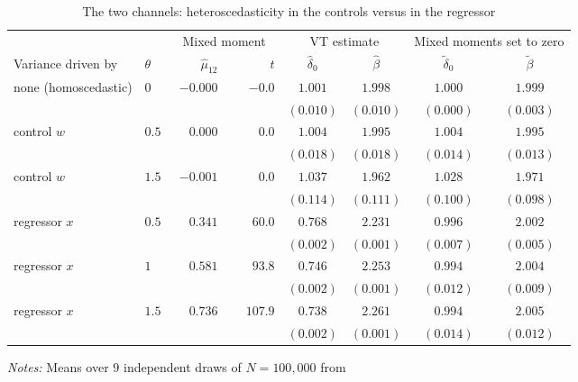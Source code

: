 \begin{table}[!h]
\centering
\caption{The two channels: heteroscedasticity in the controls versus in the regressor}
\label{tab:het_channels}
\begin{threeparttable}
\begin{tabular}{llrrcccc}
\toprule
& & \multicolumn{2}{c}{Mixed moment}
& \multicolumn{2}{c}{VT estimate}
& \multicolumn{2}{c}{Mixed moments set to zero} \\
\cmidrule(lr){3-4}\cmidrule(lr){5-6}\cmidrule(lr){7-8}
Variance driven by & \(\theta\)
& \(\widehat\mu_{12}\) & \(t\)
& \(\widehat\delta_0\) & \(\widehat\beta\)
& \(\widetilde\delta_0\) & \(\widetilde\beta\) \\
\midrule
none (homoscedastic) & \(0\) & \(-0.000\) & \(-0.0\)
  & \(1.001\) & \(1.998\) & \(1.000\) & \(1.999\) \\
  & & & & \((0.010)\) & \((0.010)\) & \((0.000)\) & \((0.003)\) \\
\midrule
control \(w\) & \(0.5\) & \(\phantom{-}0.000\) & \(\phantom{-}0.0\)
  & \(1.004\) & \(1.995\) & \(1.004\) & \(1.995\) \\
  & & & & \((0.018)\) & \((0.018)\) & \((0.014)\) & \((0.013)\) \\
control \(w\) & \(1.5\) & \(-0.001\) & \(\phantom{-}0.0\)
  & \(1.037\) & \(1.962\) & \(1.028\) & \(1.971\) \\
  & & & & \((0.114)\) & \((0.111)\) & \((0.100)\) & \((0.098)\) \\
\midrule
regressor \(x\) & \(0.5\) & \(\phantom{-}0.341\) & \(\phantom{-}60.0\)
  & \(0.768\) & \(2.231\) & \(0.996\) & \(2.002\) \\
  & & & & \((0.002)\) & \((0.001)\) & \((0.007)\) & \((0.005)\) \\
regressor \(x\) & \(1\) & \(\phantom{-}0.581\) & \(\phantom{-}93.8\)
  & \(0.746\) & \(2.253\) & \(0.994\) & \(2.004\) \\
  & & & & \((0.002)\) & \((0.001)\) & \((0.012)\) & \((0.009)\) \\
regressor \(x\) & \(1.5\) & \(\phantom{-}0.736\) & \(\phantom{-}107.9\)
  & \(0.738\) & \(2.261\) & \(0.994\) & \(2.005\) \\
  & & & & \((0.002)\) & \((0.001)\) & \((0.014)\) & \((0.012)\) \\
\bottomrule
\end{tabular}
\begin{tablenotes}
\small
\item \textit{Notes:} Means over \(9\) independent draws of \(N=100{,}000\) from

\end{tablenotes}
\end{threeparttable}
\end{table}

